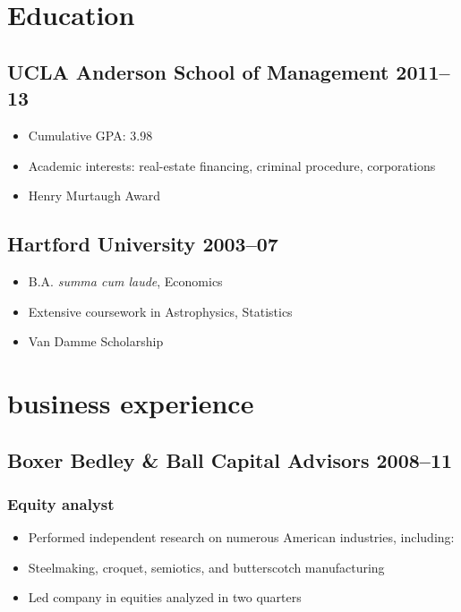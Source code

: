 \documentclass{article}
\begin{document}
	\begin{center}
		{\LARGE\AlegreyaSansMedium {}} \\ \bigskip
		\sffamily{} \\ \medskip
	\end{center}

	\section{Education}
	\subsection{UCLA Anderson School of Management \hfill 2011–13}
	\begin{itemize}
		\item Cumulative GPA: 3.98
		\item Academic interests: real-estate financing, criminal procedure, corporations
		\item Henry Murtaugh Award
	\end{itemize}
	
	\subsection{Hartford University \hfill 2003–07}
	\begin{itemize}
		\item B.A. \textit{summa cum laude}, Economics
		\item Extensive coursework in Astrophysics, Statistics
		\item Van Damme Scholarship
	\end{itemize}
	
\section{business experience}
	\subsection{Boxer Bedley \& Ball Capital Advisors \hfill 2008–11}
	\subsubsection{Equity analyst}
	\begin{itemize}
		\item Performed independent research on numerous American industries, including:
		\item Steelmaking, croquet, semiotics, and butterscotch manufacturing
		\item Led company in equities analyzed in two quarters
	\end{itemize}
	
\end{document}
